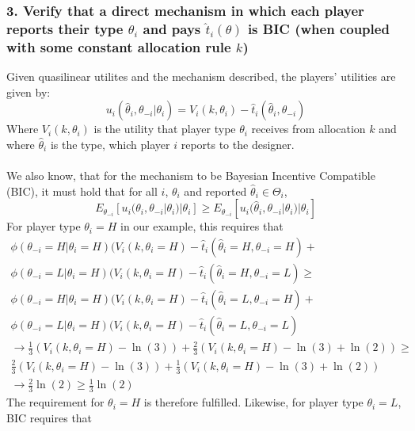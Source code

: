 \documentclass[a4paper]{article}
\begin{document}
	\subsubsection*{3. Verify that a direct mechanism in which each player reports their type $\theta_{i}$ and pays $\hat{t}_{i}(\theta)$ is BIC (when
		coupled with some constant allocation rule $k$)}
	Given quasilinear utilites and the mechanism described, the players' utilities are given by:
	\begin{equation}
		u_{i}(\hat{\theta}_{i},\theta_{-i}|\theta_{i})=V_{i}(k,\theta_{i}) - \hat{t}_{i}(\hat{\theta}_{i},\theta_{-i})
	\end{equation}
	Where $V_{i}(k,\theta_{i})$ is the utility that player type $\theta_{i}$ receives from allocation $k$ and where $\hat{\theta}_{i}$ is the type, which player $i$ reports to the designer.\\\\
	We also know, that for the mechanism to be Bayesian Incentive Compatible (BIC), it must hold that for all $i$, $\theta_{i}$ and reported $\hat{\theta}_{i}\in\Theta_i$,
	\begin{equation}
		E_{\theta_{-i}}[u_{i}(\theta_{i},\theta_{-i}|\theta_{i})|\theta_{i}] \geq E_{\theta_{-i}}[u_{i}(\hat{\theta}_{i},\theta_{-i}|\theta_{i})|\theta_{i}]
	\end{equation}
	For player type $\theta_{i}=H$ in our example, this requires that
	\begin{align}
		\phi(\theta_{-i}=H|\theta_{i}=H)(V_{i}(k,\theta_{i}=H)-\hat{t}_{i}(\hat{\theta}_{i}=H,\theta_{-i}=H) + \nonumber \\\phi(\theta_{-i}=L|\theta_{i}=H)(V_{i}(k,\theta_{i}=H)-\hat{t}_{i}(\hat{\theta}_{i}=H,\theta_{-i}=L) \geq \nonumber\\
		\phi(\theta_{-i}=H|\theta_{i}=H)(V_{i}(k,\theta_{i}=H)-\hat{t}_{i}(\hat{\theta}_{i}=L,\theta_{-i}=H) + \nonumber \\\phi(\theta_{-i}=L|\theta_{i}=H)(V_{i}(k,\theta_{i}=H)-\hat{t}_{i}(\hat{\theta}_{i}=L,\theta_{-i}=L)\\
		\rightarrow \frac{1}{3}(V_{i}(k,\theta_{i}=H)-\ln(3))+\frac{2}{3}(V_{i}(k,\theta_{i}=H)-\ln(3)+\ln(2)) \geq \nonumber\\ \frac{2}{3}(V_{i}(k,\theta_{i}=H)-\ln(3))+\frac{1}{3}(V_{i}(k,\theta_{i}=H)-\ln(3)+\ln(2))\\
		\rightarrow \frac{2}{3}\ln(2) \geq \frac{1}{3}\ln(2)
	\end{align}
	The requirement for $\theta_{i}=H$ is therefore fulfilled. Likewise, for player type $\theta_{i}=L$, BIC requires that
\end{document}
